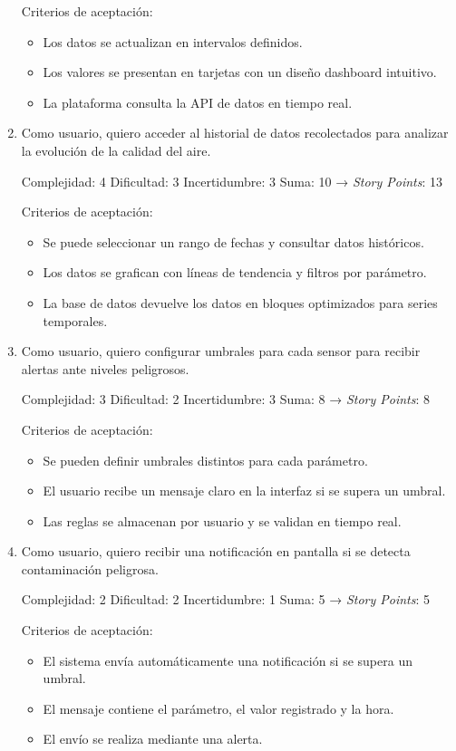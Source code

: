 \documentclass[
11pt, %
]{charter}
\begin{document}
\begin{enumerate}
	Criterios de aceptación:
	\begin{itemize}
		\item Los datos se actualizan en intervalos definidos.
		\item Los valores se presentan en tarjetas con un diseño dashboard intuitivo.
		\item La plataforma consulta la API de datos en tiempo real.
	\end{itemize}
	\item Como usuario, quiero acceder al historial de datos recolectados para analizar la evolución de la calidad del aire.

	Complejidad: 4
	Dificultad: 3
	Incertidumbre: 3
	Suma: 10 → \textit{Story Points}: 13

	Criterios de aceptación:
	\begin{itemize}
		\item Se puede seleccionar un rango de fechas y consultar datos históricos.
		\item Los datos se grafican con líneas de tendencia y filtros por parámetro.
		\item La base de datos devuelve los datos en bloques optimizados para series temporales.
	\end{itemize}
	
	\item Como usuario, quiero configurar umbrales para cada sensor para recibir alertas ante niveles peligrosos.

	Complejidad: 3
	Dificultad: 2
	Incertidumbre: 3
	Suma: 8 → \textit{Story Points}: 8

	Criterios de aceptación:
	\begin{itemize}
		\item Se pueden definir umbrales distintos para cada parámetro.
		\item El usuario recibe un mensaje claro en la interfaz si se supera un umbral.
		\item Las reglas se almacenan por usuario y se validan en tiempo real.
	\end{itemize}
	\item Como usuario, quiero recibir una notificación en pantalla si se detecta contaminación peligrosa.

	Complejidad: 2
	Dificultad: 2
	Incertidumbre: 1
	Suma: 5 → \textit{Story Points}: 5

	Criterios de aceptación:
	\begin{itemize}
		\item El sistema envía automáticamente una notificación si se supera un umbral.
		\item El mensaje contiene el parámetro, el valor registrado y la hora.
		\item El envío se realiza mediante una alerta.
	\end{itemize}	
	

\end{enumerate}
\end{document}
